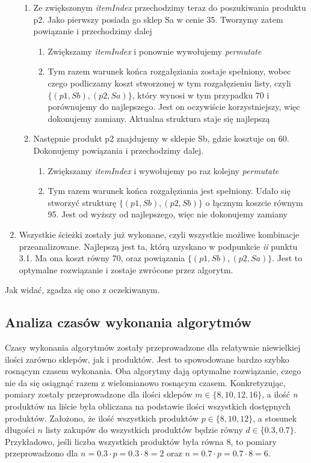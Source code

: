 \documentclass[a4paper]{article}
\begin{document}
\begin{enumerate}
{\begin{enumerate}
\item { Ze zwiększonym \textit{itemIndex} przechodzimy teraz do poszukiwania produktu p2. Jako pierwszy posiada go sklep Sa w cenie 35. Tworzymy zatem powiązanie i przechodzimy dalej
\begin{enumerate}
\item {Zwiększamy \textit{itemIndex} i ponownie wywołujemy \textit{permutate}}
\item {Tym razem warunek końca rozgałęziania zostaje spełniony, wobec czego podliczamy koszt stworzonej w tym rozgałęzieniu listy, czyli $\{(p1, Sb), (p2, Sa)\}$, który wynosi w tym przypadku 70 i porównujemy do najlepszego. Jest on oczywiście korzystniejszy, więc dokonujemy zamiany. Aktualna struktura staje się najlepszą}
\end{enumerate}
}
\item{Następnie produkt p2 znajdujemy w sklepie Sb, gdzie kosztuje on 60. Dokonujemy powiązania i przechodzimy dalej.
\begin{enumerate}
\item{Zwiększamy \textit{itemIndex} i wywołujemy po raz kolejny \textit{permutate}}
\item{Tym razem warunek końca rozgałęziania jest spełniony. Udało się stworzyć strukturę $\{(p1, Sb), (p2, Sb)\}$ o łącznym koszcie równym 95. Jest od wyższy od najlepszego, więc nie dokonujemy zamiany}
\end{enumerate}
}
\end{enumerate}
}
\item {Wszystkie ścieżki zostały już wykonane, czyli wszystkie możliwe kombinacje przeanalizowane. Najlepszą jest ta, którą uzyskano w podpunkcie \textit{ii} punktu 3.1. Ma ona koszt równy 70, oraz powiązania $\{(p1, Sb), (p2, Sa)\}$. Jest to optymalne rozwiązanie i zostaje zwrócone przez algorytm.}
\end{enumerate}

Jak widać, zgadza się ono z oczekiwanym.
\subsection{Analiza czasów wykonania algorytmów}
Czasy wykonania algorytmów zostały przeprowadzone dla relatywnie niewielkiej ilości zarówno sklepów, jak i produktów. Jest to spowodowane bardzo szybko rosnącym czasem wykonania. Oba algorytmy dają optymalne rozwiązanie, czego nie da się osiągnąć razem z wielomianowo rosnącym czasem. Konkretyzując, pomiary zostały przeprowadzone dla ilości sklepów $m \in \{8, 10, 12, 16\}$, a ilość \textit{n} produktów na liście była obliczana na podstawie ilości wszystkich dostępnych produktów. Założono, że ilość wszystkich produktów $p \in \{8, 10, 12\}$, a stosunek długości $n$ listy zakupów do wszystkich produktów będzie równy $d \in \{0.3, 0.7\}$. Przykładowo, jeśli liczba wszystkich produktów była równa $8$, to pomiary przeprowadzono dla $n=0.3 \cdot p=0.3 \cdot 8 = 2$ oraz $n=0.7 \cdot p=0.7 \cdot 8 = 6$. 
\end{document}
